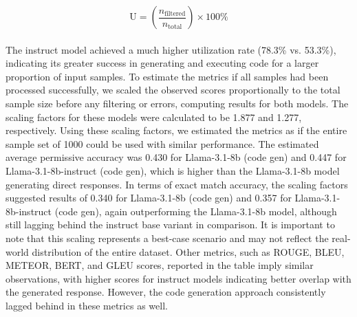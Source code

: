 \documentclass[logo,msc]{infthesis}           %
\begin{document}
\[
\text{U} = \left( \frac{n_{\text{filtered}}}{n_{\text{total}}} \right) \times 100\%
\]
\\
The instruct model achieved a much higher utilization rate (78.3\% vs. 53.3\%), indicating its greater success in generating and executing code for a larger proportion of input samples.
To estimate the metrics if all samples had been processed successfully, we scaled the observed scores proportionally to the total sample size before any filtering or errors, computing results for both models. The scaling factors for these models were calculated to be 1.877 and 1.277, respectively. Using these scaling factors, we estimated the metrics as if the entire sample set of 1000 could be used with similar performance. The estimated average permissive accuracy was 0.430 for Llama-3.1-8b (code gen) and 0.447 for Llama-3.1-8b-instruct (code gen), which is higher than the Llama-3.1-8b model generating direct responses. In terms of exact match accuracy, the scaling factors suggested results of 0.340 for Llama-3.1-8b (code gen) and 0.357 for Llama-3.1-8b-instruct (code gen), again outperforming the Llama-3.1-8b model, although still lagging behind the instruct base variant in comparison. It is important to note that this scaling represents a best-case scenario and may not reflect the real-world distribution of the entire dataset. Other metrics, such as ROUGE, BLEU, METEOR, BERT, and GLEU scores, reported in the table imply similar observations, with higher scores for instruct models indicating better overlap with the generated response. However, the code generation approach consistently lagged behind in these metrics as well. 
\end{document}
